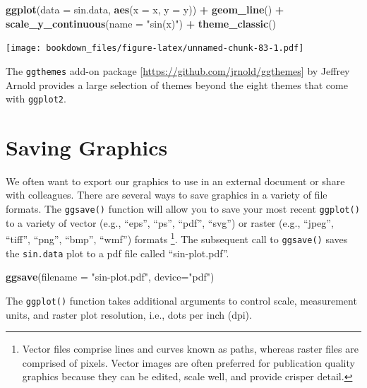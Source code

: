 \documentclass[
]{krantz}
\makeatletter
\newenvironment{Shaded}{\begin{snugshade}}{\end{snugshade}}
\newcommand{\DataTypeTok}[1]{\textcolor[rgb]{0.27,0.27,0.27}{#1}}
\newcommand{\KeywordTok}[1]{\textcolor[rgb]{0.27,0.27,0.27}{\textbf{#1}}}
\newcommand{\NormalTok}[1]{#1}
\newcommand{\OperatorTok}[1]{\textcolor[rgb]{0.43,0.43,0.43}{\textbf{#1}}}
\newcommand{\StringTok}[1]{\textcolor[rgb]{0.5,0.5,0.5}{#1}}
\newenvironment{kframe}{%
\medskip{}
\setlength{\fboxsep}{.8em}
 \def\at@end@of@kframe{}%
 \ifinner\ifhmode%
  \def\at@end@of@kframe{\end{minipage}}%
  \begin{minipage}{\columnwidth}%
 \fi\fi%
 \def\FrameCommand##1{\hskip\@totalleftmargin \hskip-\fboxsep
 \colorbox{shadecolor}{##1}\hskip-\fboxsep
     \hskip-\linewidth \hskip-\@totalleftmargin \hskip\columnwidth}%
 \MakeFramed {\advance\hsize-\width
   \@totalleftmargin\z@ \linewidth\hsize
   \@setminipage}}%
 {\par\unskip\endMakeFramed%
 \at@end@of@kframe}
\renewenvironment{Shaded}{\begin{kframe}}{\end{kframe}}
\makeatother
\begin{document}
\begin{Shaded}
\begin{Highlighting}[]
\KeywordTok{ggplot}\NormalTok{(}\DataTypeTok{data =}\NormalTok{ sin.data, }\KeywordTok{aes}\NormalTok{(}\DataTypeTok{x =}\NormalTok{ x, }\DataTypeTok{y =}\NormalTok{ y)) }\OperatorTok{+}\StringTok{ }\KeywordTok{geom\_line}\NormalTok{() }\OperatorTok{+}\StringTok{ }
\StringTok{    }\KeywordTok{scale\_y\_continuous}\NormalTok{(}\DataTypeTok{name =} \StringTok{"sin(x)"}\NormalTok{) }\OperatorTok{+}
\StringTok{    }\KeywordTok{theme\_classic}\NormalTok{()}
\end{Highlighting}
\end{Shaded}

\texttt{[image: bookdown\_files/figure-latex/unnamed-chunk-83-1.pdf]}

The \texttt{ggthemes} add-on package {[}\url{https://github.com/jrnold/ggthemes}{]} by Jeffrey Arnold provides a large selection of themes beyond the eight themes that come with \texttt{ggplot2}.

\hypertarget{saving-graphics}{%
\section{Saving Graphics}\label{saving-graphics}}

We often want to export our graphics to use in an external document or share with colleagues. There are several ways to save graphics in a variety of file formats. The \texttt{ggsave()} function will allow you to save your most recent \texttt{ggplot()} to a variety of vector (e.g., ``eps'', ``ps'', ``pdf'', ``svg'') or raster (e.g., ``jpeg'', ``tiff'', ``png'', ``bmp'', ``wmf'') formats \footnote{Vector files comprise lines and curves known as paths, whereas raster files are comprised of pixels. Vector images are often preferred for publication quality graphics because they can be edited, scale well, and provide crisper detail.}. The subsequent call to \texttt{ggsave()} saves the \texttt{sin.data} plot to a pdf file called ``sin-plot.pdf''.

\begin{Shaded}
\begin{Highlighting}[]
\KeywordTok{ggsave}\NormalTok{(}\DataTypeTok{filename =} \StringTok{"sin{-}plot.pdf"}\NormalTok{, }\DataTypeTok{device=}\StringTok{"pdf"}\NormalTok{)}
\end{Highlighting}
\end{Shaded}

The \texttt{ggplot()} function takes additional arguments to control scale, measurement units, and raster plot resolution, i.e., dots per inch (dpi).
\end{document}

